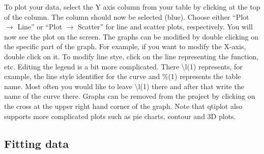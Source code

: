 \documentclass[byrevtex,amssymb,aps,pra,floatfix,letterpaper]{revtex4}
\begin{document}
To plot your data, select the Y axis column from your table by clicking at the top of the column. The column should now be selected (blue). Choose either ``Plot $\rightarrow$ Line'' or ``Plot $\rightarrow$ Scatter'' for line and scatter plots, respectively. You will now see the plot on the screen. The graphs can be modified by double clicking on the specific part of the graph. For example, if you want to modify the X-axis, double click on it. To modify line stye, click on the line representing the function, etc. Editing the legend is a bit more complicated. There \textbackslash l(1) represents, for example, the line style identifier for the curve and \%(1) represents the table name. Most often you would like to leave \textbackslash l(1) there and after that write the name of the curve there. Graphs can be removed from the project by clicking on the cross at the upper right hand corner of the graph. Note that qtiplot also supports more complicated plots such as pie charts, contour and 3D plots.

\subsection{Fitting data}
\end{document}
